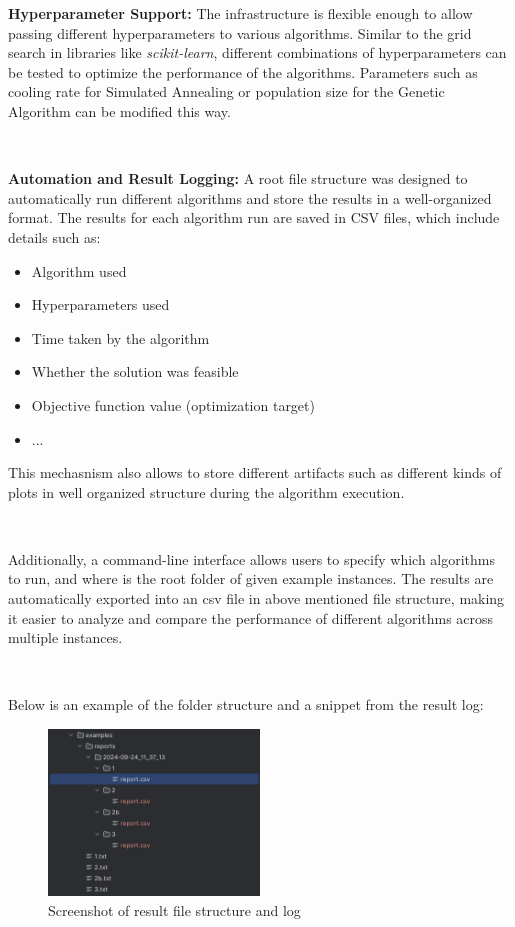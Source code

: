 \documentclass[a4paper,12pt]{article}
\begin{document}
\noindent \textbf{Hyperparameter Support:}
The infrastructure is flexible enough to allow passing different hyperparameters to various algorithms. Similar to the grid search in libraries like \textit{scikit-learn}, different combinations of hyperparameters can be tested to optimize the performance of the algorithms. Parameters such as cooling rate for Simulated Annealing or population size for the Genetic Algorithm can be modified this way.

\

\noindent \textbf{Automation and Result Logging:}
A root file structure was designed to automatically run different algorithms and store the results in a well-organized format. The results for each algorithm run are saved in CSV files, which include details such as:
\begin{itemize}
    \item Algorithm used
    \item Hyperparameters used
    \item Time taken by the algorithm
    \item Whether the solution was feasible
    \item Objective function value (optimization target)
    \item ...
\end{itemize}

\noindent This mechasnism also allows to store different artifacts such as different kinds of plots in well organized structure during the algorithm execution.

\

\noindent Additionally, a command-line interface allows users to specify which algorithms to run, and where is the root folder of given example instances. The results are automatically exported into an csv file in above mentioned file structure, making it easier to analyze and compare the performance of different algorithms across multiple instances.

\

\noindent Below is an example of the folder structure and a snippet from the result log:

\begin{figure}[H]
    \centering
    \includegraphics[width=0.5\textwidth]{reports-structure.png}
    \caption{Screenshot of result file structure and log}
\end{figure}
\end{document}
